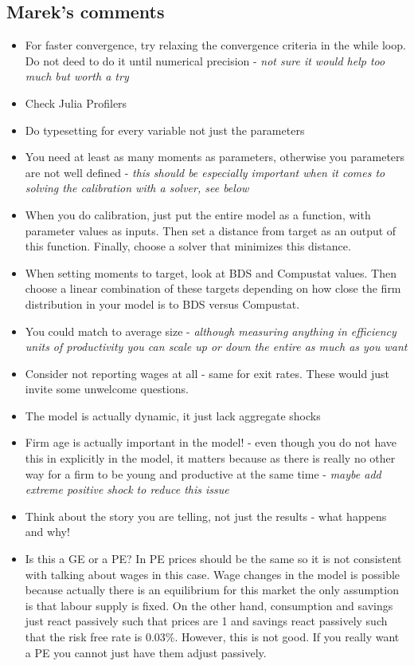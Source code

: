 \documentclass[12pt]{article}
\begin{document}
\subsection*{Marek's comments}
\begin{itemize}\setlength\itemsep{0em} \small
    \item For faster convergence, try relaxing the convergence criteria in the while loop. Do not deed to do it until numerical precision - \textit{not sure it would help too much but worth a try}
    \item Check Julia Profilers 
    \item Do typesetting for every variable not just the parameters
    \item You need at least as many moments as parameters, otherwise you parameters are not well defined - \textit{this should be especially important when it comes to solving the calibration with a solver, see below}
    \item When you do calibration, just put the entire model as a function, with parameter values as inputs. Then set a distance from target as an output of this function. Finally, choose a solver that minimizes this distance. 
    \item When setting moments to target, look at BDS and Compustat values. Then choose a linear combination of these targets depending on how close the firm distribution in your model is to BDS versus Compustat. 
    \item You could match to average size - \textit{although measuring anything in efficiency units of productivity you can scale up or down the entire as much as you want}
    \item Consider not reporting wages at all - same for exit rates. These would just invite some unwelcome questions.
    \item The model is actually dynamic, it just lack aggregate shocks 
    \item Firm age is actually important in the model! - even though you do not have this in explicitly in the model, it matters because as there is really no other way for a firm to be young and productive at the same time - \textit{maybe add extreme positive shock to reduce this issue}
    \item Think about the story you are telling, not just the results - what happens and why!
    \item Is this a GE or a PE? In PE prices should be the same so it is not consistent with talking about wages in this case. Wage changes in the model is possible because actually there is an equilibrium for this market the only assumption is that labour supply is fixed. On the other hand, consumption and savings just react passively such that prices are 1 and savings react passively such that the risk free rate is 0.03\%. However, this is not good. If you really want a PE you cannot just have them adjust passively.  

\end{itemize}
\end{document}

